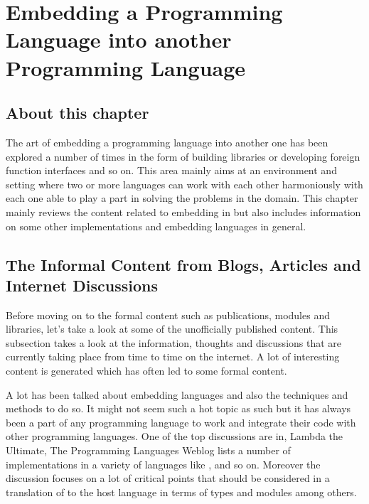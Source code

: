 \documentclass[thesis-solanki.tex]{subfiles}
\begin{document}
\chapter{Embedding a Programming Language into another Programming Language }\label{chap:embedding}


\section{About this chapter}

The art of embedding a programming language into another one has been explored a number of times in the form of
building libraries or developing foreign function interfaces and so on.
This area mainly aims at an environment and setting where two or more languages can work with each other
harmoniously with each one able to play a part in solving the problems in the domain.
This chapter mainly reviews the content related to embedding  in  but also
includes information on some other implementations and embedding languages in general.


\section{The Informal Content from Blogs, Articles and Internet Discussions}

Before moving on to the formal content such as publications, modules and libraries, let's take a look
at some of the unofficially published content.
This subsection takes a look at the information, thoughts and discussions that are currently taking place from time
to time on the internet.
A lot of interesting content is generated which has often led to some formal content.

A lot has been talked about embedding languages and also the techniques and methods to do so.
It might not seem such a hot topic as such but it has always been a part of any programming language to work and
integrate their code with other programming languages.
One of the top discussions are in, Lambda the Ultimate, The Programming Languages Weblog
\cite{website:lambda-the-ultimate} lists a number of  implementations in a variety of languages
like ,  \cite{racklog} and so on.
Moreover the discussion focuses on a lot of critical points that should be considered in a translation of
 to the host language in terms of types and modules among others.
\end{document}
